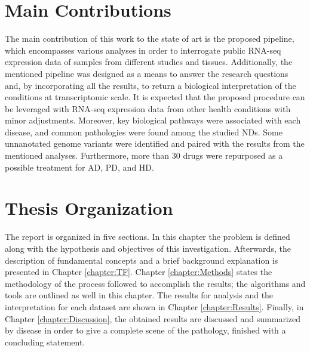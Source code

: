 \section{Main Contributions}
The main contribution of this work to the state of art is the proposed pipeline, which encompasses various analyses in order to interrogate public RNA-seq expression data of samples from different studies and tissues. Additionally, the mentioned pipeline was designed as a means to answer the research questions and, by incorporating all the results, to return a biological interpretation of the conditions at transcriptomic scale. It is expected that the proposed procedure can be leveraged with RNA-seq expression data from other health conditions with minor adjustments. Moreover, key biological pathways were associated with each disease, and common pathologies were found among the studied NDs. Some unnanotated genome variants were identified and paired with the results from the mentioned analyses. Furthermore, more than 30 drugs were repurposed as a possible treatment for AD, PD, and HD.

\section{Thesis Organization}

The report is organized in five sections. In this chapter the problem is deﬁned along with the hypothesis and objectives of this investigation. Afterwards, the description of fundamental concepts and a brief background explanation is presented in Chapter \ref{chapter:TF}. Chapter \ref{chapter:Methods} states the methodology of the process followed to accomplish the results; the algorithms and tools are outlined as well in this chapter. The results for analysis and the interpretation for each dataset are shown in Chapter \ref{chapter:Results}. Finally, in Chapter \ref{chapter:Discussion}, the obtained results are discussed and summarized by disease in order to give a complete scene of the pathology, finished with a concluding statement.